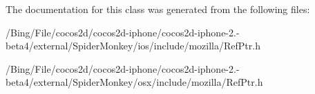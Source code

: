 The documentation for this class was generated from the following files\-:\begin{DoxyCompactItemize}
\item 
/\-Bing/\-File/cocos2d/cocos2d-\/iphone/cocos2d-\/iphone-\/2.-\/beta4/external/\-Spider\-Monkey/ios/include/mozilla/Ref\-Ptr.\-h\item 
/\-Bing/\-File/cocos2d/cocos2d-\/iphone/cocos2d-\/iphone-\/2.-\/beta4/external/\-Spider\-Monkey/osx/include/mozilla/Ref\-Ptr.\-h\end{DoxyCompactItemize}
